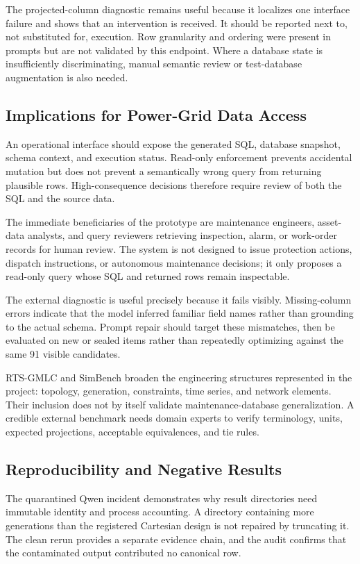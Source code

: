 \documentclass[applsci,article,submit,moreauthors]{Definitions/mdpi}
\begin{document}
The projected-column diagnostic remains useful because it localizes one interface failure and shows that an intervention is received. It should be reported next to, not substituted for, execution. Row granularity and ordering were present in prompts but are not validated by this endpoint. Where a database state is insufficiently discriminating, manual semantic review or test-database augmentation is also needed.

\subsection{Implications for Power-Grid Data Access}
An operational interface should expose the generated SQL, database snapshot, schema context, and execution status. Read-only enforcement prevents accidental mutation but does not prevent a semantically wrong query from returning plausible rows. High-consequence decisions therefore require review of both the SQL and the source data.

The immediate beneficiaries of the prototype are maintenance engineers, asset-data analysts, and query reviewers retrieving inspection, alarm, or work-order records for human review. The system is not designed to issue protection actions, dispatch instructions, or autonomous maintenance decisions; it only proposes a read-only query whose SQL and returned rows remain inspectable.

The external diagnostic is useful precisely because it fails visibly. Missing-column errors indicate that the model inferred familiar field names rather than grounding to the actual schema. Prompt repair should target these mismatches, then be evaluated on new or sealed items rather than repeatedly optimizing against the same 91 visible candidates.

RTS-GMLC and SimBench broaden the engineering structures represented in the project: topology, generation, constraints, time series, and network elements. Their inclusion does not by itself validate maintenance-database generalization. A credible external benchmark needs domain experts to verify terminology, units, expected projections, acceptable equivalences, and tie rules.

\subsection{Reproducibility and Negative Results}
The quarantined Qwen incident demonstrates why result directories need immutable identity and process accounting. A directory containing more generations than the registered Cartesian design is not repaired by truncating it. The clean rerun provides a separate evidence chain, and the audit confirms that the contaminated output contributed no canonical row.
\end{document}
